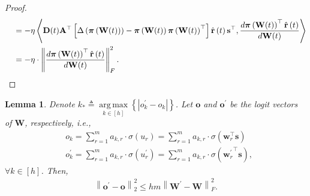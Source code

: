 \documentclass[10pt]{article}
\def\rvo{{\mathbf{o}}}
\def\rvr{{\mathbf{r}}}
\def\rvs{{\mathbf{s}}}
\def\rvw{{\mathbf{w}}}
\def\rvo{{\mathbf{o}}}
\newtheorem{lem}{Lemma}
\def\rvpi{{\boldsymbol{\pi}}}
\def\rmA{{\mathbf{A}}}
\def\rmD{{\mathbf{D}}}
\def\rmW{{\mathbf{W}}}
\DeclareMathOperator*{\argmax}{arg\,max}
\begin{document}
\begin{proof}
\begin{equation*}
\begin{split}
    &\quad = - \eta \left\langle \rmD(t) \rmA^\top \left[\Delta\left( \rvpi\left( \rmW(t) \right) \right) - \rvpi\left( \rmW(t) \right) \rvpi\left( \rmW(t) \right)^\top \right] \hat{\rvr}\left(t\right) \rvs^\top, \frac{d \rvpi\left(\rmW(t)\right)^\top \hat{\rvr}\left(t\right)}{d \rmW(t)} \right\rangle \\
    &\quad = - \eta \cdot \left\| \frac{d \rvpi\left(\rmW(t)\right)^\top \hat{\rvr}\left(t\right)}{d \rmW(t)} \right\|_F^2. \qedhere
\end{split}
\end{equation*}
\end{proof}

\begin{lem}
\label{lem:logit_upper_bound_parameter}
Denote $k_* \triangleq \argmax\limits_{k \in [h]}\left\{ \left| o_{k}^\prime - o_{k} \right| \right\}$. Let $\rvo$ and $\rvo^\prime$ be the logit vectors of $\rmW$, respectively, i.e.,
\begin{equation*}
\begin{split}
    &o_{k} = \sum\limits_{r=1}^{m}{ a_{k,r} \cdot \sigma\left( u_{r} \right)} = \sum\limits_{r=1}^{m}{ a_{k,r} \cdot \sigma\left(\rvw_r^\top \rvs \right)} \\
    &o_{k}^\prime = \sum\limits_{r=1}^{m}{ a_{k,r} \cdot \sigma\left( u_{r}^\prime \right)} = \sum\limits_{r=1}^{m}{ a_{k,r} \cdot \sigma\left({\rvw_r^\prime}^\top \rvs \right)},
\end{split}
\end{equation*}
$\forall k \in [h]$. Then,
\begin{equation*}
\begin{split}
    \left\| \rvo^\prime - \rvo \right\|_2^2 \le h m \left\| \rmW^\prime - \rmW \right\|_F^2.
\end{split}
\end{equation*}
\end{lem}
\end{document}
